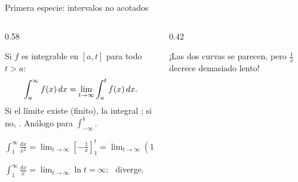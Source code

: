 \documentclass[10pt,aspectratio=169]{beamer}
\begin{document}
\begin{frame}{Primera especie: intervalos no acotados}
  \begin{columns}
    \begin{column}{0.58\textwidth}
      \begin{definicion}
        Si $f$ es integrable en $[a,t]$ para todo $t>a$:
        \[ \int_a^\infty f(x)\,dx=\lim_{t\to\infty}\int_a^tf(x)\,dx. \]
        Si el límite existe (finito), la integral ; si no, . Análogo para $\int_{-\infty}^b$.
      \end{definicion}
      \begin{ejemplo}[1]
        $\displaystyle\int_1^\infty\frac{dx}{x^2}=\lim_{t\to\infty}\left[-\frac1x\right]_1^t=\lim_{t\to\infty}\left(1-\frac1t\right)=1.$
      \end{ejemplo}
      \begin{ejemplo}[2]
        $\displaystyle\int_1^\infty\frac{dx}{x}=\lim_{t\to\infty}\ln t=\infty$: \ diverge.
      \end{ejemplo}
    \end{column}
    \begin{column}{0.42\textwidth}
      \centering

      \small ¡Las dos curvas se parecen, pero $\frac1x$ decrece demasiado lento!
    \end{column}
  \end{columns}
\end{frame}
\end{document}
